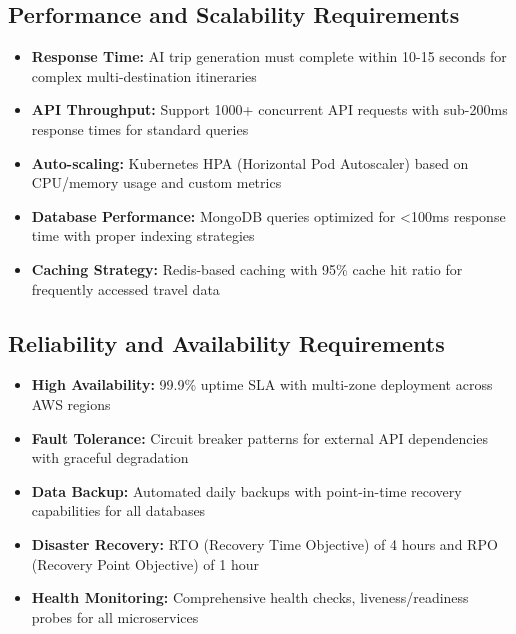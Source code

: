 \subsection{Performance and Scalability Requirements}
\begin{itemize}
    \item \textbf{Response Time:} AI trip generation must complete within 10-15 seconds for complex multi-destination itineraries
    \item \textbf{API Throughput:} Support 1000+ concurrent API requests with sub-200ms response times for standard queries
    \item \textbf{Auto-scaling:} Kubernetes HPA (Horizontal Pod Autoscaler) based on CPU/memory usage and custom metrics
    \item \textbf{Database Performance:} MongoDB queries optimized for <100ms response time with proper indexing strategies
    \item \textbf{Caching Strategy:} Redis-based caching with 95\% cache hit ratio for frequently accessed travel data
\end{itemize}

\subsection{Reliability and Availability Requirements}
\begin{itemize}
    \item \textbf{High Availability:} 99.9\% uptime SLA with multi-zone deployment across AWS regions
    \item \textbf{Fault Tolerance:} Circuit breaker patterns for external API dependencies with graceful degradation
    \item \textbf{Data Backup:} Automated daily backups with point-in-time recovery capabilities for all databases
    \item \textbf{Disaster Recovery:} RTO (Recovery Time Objective) of 4 hours and RPO (Recovery Point Objective) of 1 hour
    \item \textbf{Health Monitoring:} Comprehensive health checks, liveness/readiness probes for all microservices
\end{itemize}

